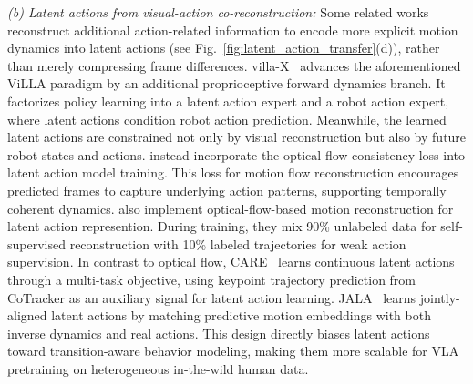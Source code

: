 \documentclass[Afour,sageh,times]{sagej}
\begin{document}
\textit{(b) Latent actions from visual-action co-reconstruction:} Some related works reconstruct additional action-related information to encode more explicit motion dynamics into latent actions (see Fig.~\ref{fig:latent_action_transfer}(d)), rather than merely compressing frame differences. villa-X~\citep{chen2025villa} advances the aforementioned ViLLA paradigm by an additional proprioceptive forward dynamics branch. It factorizes policy learning into a latent action expert and a robot action expert, where latent actions condition robot action prediction. Meanwhile, the learned latent actions are constrained not only by visual reconstruction but also by future robot states and actions. \cite{routray2025vipra} instead incorporate the optical flow consistency loss into latent action model training. This loss for motion flow reconstruction encourages predicted frames to capture underlying action patterns, supporting temporally coherent dynamics. \cite{bi2025motus} also implement optical-flow-based motion reconstruction for latent action represention. During training, they mix 90\% unlabeled data for self-supervised reconstruction with 10\% labeled trajectories for weak action supervision. In contrast to optical flow, CARE~\citep{shi2026care} learns continuous latent actions through a multi-task objective, using keypoint trajectory prediction from CoTracker as an auxiliary signal for latent action learning. JALA~\citep{luo2026joint} learns jointly-aligned latent actions by matching predictive motion embeddings with both inverse dynamics and real actions. This design directly biases latent actions toward transition-aware behavior modeling, making them more scalable for VLA pretraining on heterogeneous in-the-wild human data. 
\end{document}
